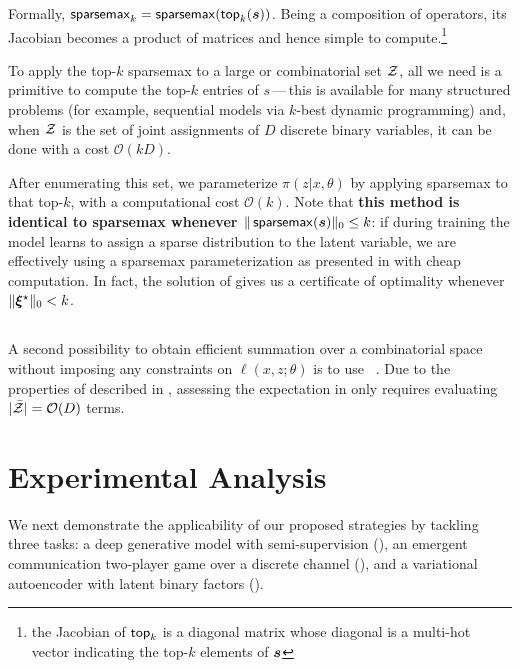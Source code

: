 Formally, $\operatorname{\mathsf{sparsemax}_\text{$k$}} = \operatorname*{\mathsf{sparsemax}}(\operatorname{\mathsf{top}_\text{$k$}}(\bm{s}))$. Being a composition
of operators, its Jacobian becomes a product of matrices and hence
simple to compute.\footnote{the Jacobian of $\operatorname{\mathsf{top}_\text{$k$}}$ is a diagonal matrix whose
    diagonal is a multi-hot vector indicating the top-$k$ elements of
    $\bm{s}$}

To apply the top-$k$ sparsemax to a large or combinatorial set $\mathcal{Z}$,
all we need is a primitive to compute the top-$k$ entries of
$s$\,---\,this is available for many structured problems (for example,
sequential models via $k$-best dynamic programming) and, when $\mathcal{Z}$
is the set of joint assignments of $D$ discrete binary variables, it
can be done with a cost $\mathcal{O}(kD)$.

After enumerating this set, we parameterize $\pi(z|x,\theta)$ by
applying sparsemax to that top-$k$, with a
computational cost $\mathcal{O}(k)$. Note that {\bf this method is
        identical to sparsemax whenever $\|\operatorname*{\mathsf{sparsemax}}(\bm{s})\|_0 \le k$}: if
during training the model learns to assign a sparse distribution to
the latent variable, we are effectively using a sparsemax
parameterization as presented in  with cheap
computation. In fact, the solution of 
gives us a certificate of optimality whenever $\|\bm{\xi}^\star\|_0 < k$.

\subsection{\label{sec:smap}\smap}

\noindent A second possibility to obtain efficient summation over a
combinatorial space without imposing any constraints on $\ell(x, z;
    \theta)$ is to use \smap~\citep{sparsemap, sparsemapcg}.
Due to the properties of \smap described in ,
assessing the expectation in  only requires evaluating
$|\bar{\mathcal{Z}}| = \mathcal{O}(D)$ terms.

\section{\label{sec:applications}Experimental Analysis}

\noindent We next demonstrate the applicability of our proposed strategies by
tackling three tasks: a deep generative model with semi-supervision
(), an emergent communication two-player game over a
discrete channel (), and a variational autoencoder with
latent binary factors ().

